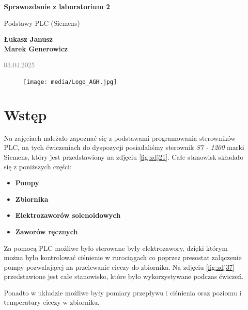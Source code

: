 \documentclass{article}
\begin{document}
\begin{titlepage}
    \begin{center}
        \vspace*{1cm}
            
        \Huge
        \textbf{Sprawozdanie z laboratorium 2}
            
        \vspace{0.5cm}
        \LARGE
        Podstawy PLC (Siemens) 
            
        \vspace{1.5cm}
            
        \textbf{Łukasz Janusz\\Marek Generowicz}

        \normalsize      
        \textcolor{gray}{03.04.2025}
        \vfill
        \begin{figure}[hb]
            \centering
            \texttt{[image: media/Logo\_AGH.jpg]}
        \end{figure}   
    \end{center}
\end{titlepage}

\newpage
\section{Wstęp}
Na zajęciach należało zapoznać się z podstawami programowania sterowników PLC, na tych ćwiczeniach do dyspozycji posiadaliśmy  sterownik \textit{S7 - 1200} marki Siemens, który jest przedstawiony na zdjęciu \ref{fig:zdj21}. Całe stanowisk składało się z poniższych części:

\begin{itemize}
    \item \textbf{Pompy} 
    \item \textbf{Zbiornika} 
    \item \textbf{Elektrozaworów solenoidowych}
    \item \textbf{Zaworów ręcznych}  
\end{itemize}

Za pomocą PLC możliwe było sterowane były elektrozawory, dzięki którym można było kontrolować ciśnienie w rurociągach co poprzez presostat załączenie pompy pozwalającej na przelewanie cieczy do zbiornika. Na zdjęciu \ref{fig:zdj37} przedstawione jest całe stanowisko, które było wykorzystywane podczas ćwiczeń.

Ponadto w układzie możliwe były pomiary przepływu i ciśnienia oraz poziomu i temperatury cieczy w zbiorniku.
\end{document}
